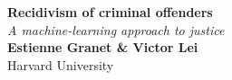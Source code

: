\documentclass[a0,landscape]{a0poster}
\begin{document}


\begin{minipage}[b]{0.55\linewidth}
\veryHuge \color{NavyBlue} \textbf{Recidivism of criminal offenders} \color{Black}\\ %
\Huge\textit{A machine-learning approach to justice}\\[1cm] %
\huge \textbf{Estienne Granet \& Victor Lei}\\ %
\huge Harvard University\\ %
\end{minipage}


\vspace{1cm} %

\end{document}
